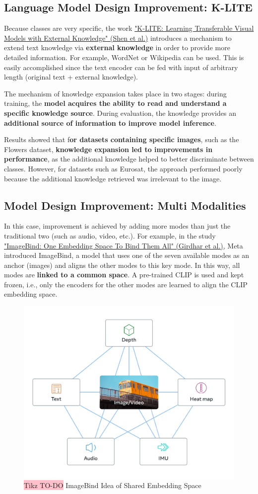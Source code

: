 \subsection{Language Model Design Improvement: K-LITE}

Because classes are very specific, the work \href{https://arxiv.org/pdf/2204.09222}{"K-LITE: Learning Transferable Visual Models with External Knowledge" (Shen et al.)} introduces a mechanism to extend text knowledge via \textbf{external knowledge} in order to provide more detailed information. For example, WordNet or Wikipedia can be used. This is easily accomplished since the text encoder can be fed with input of arbitrary length (original text + external knowledge).

The mechanism of knowledge expansion takes place in two stages: during training, the \textbf{model acquires the ability to read and understand a specific knowledge source}. During evaluation, the knowledge provides an \textbf{additional source of information to improve model inference}.

Results showed that f\textbf{or datasets containing specific images}, such as the Flowers dataset, \textbf{knowledge expansion led to improvements in performance}, as the additional knowledge helped to better discriminate between classes. However, for datasets such as Eurosat, the approach performed poorly because the additional knowledge retrieved was irrelevant to the image. 


\subsection{Model Design Improvement: Multi Modalities}

In this case, improvement is achieved by adding more modes than just the traditional two (such as audio, video, etc.). For example, in the study \href{https://arxiv.org/pdf/2305.05665}{"ImageBind: One Embedding Space To Bind Them All" (Girdhar et al.)}, Meta introduced ImageBind, a model that uses one of the seven available modes as an anchor (images) and aligns the other modes to this key mode. In this way, all modes are \textbf{linked to a common space}. A pre-trained CLIP is used and kept frozen, i.e., only the encoders for the other modes are learned to align the CLIP embedding space.

\begin{figure}[!htbp]
    \centering
    \includegraphics[width=0.6\linewidth]{tikz/chapter11 - ImageBind.png}
    \caption{{\color{red}\colorbox{pink}{Tikz TO-DO}} ImageBind Idea of Shared Embedding Space}
\end{figure}

